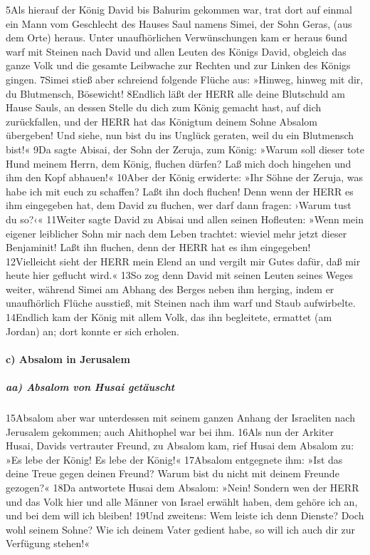 5Als hierauf der König David bis Bahurim gekommen war, trat dort auf
einmal ein Mann vom Geschlecht des Hauses Saul namens Simei, der Sohn
Geras, (aus dem Orte) heraus. Unter unaufhörlichen Verwünschungen kam er
heraus 6und warf mit Steinen nach David und allen Leuten des Königs
David, obgleich das ganze Volk und die gesamte Leibwache zur Rechten und
zur Linken des Königs gingen. 7Simei stieß aber schreiend folgende
Flüche aus: »Hinweg, hinweg mit dir, du Blutmensch, Bösewicht! 8Endlich
läßt der HERR alle deine Blutschuld am Hause Sauls, an dessen Stelle du
dich zum König gemacht hast, auf dich zurückfallen, und der HERR hat das
Königtum deinem Sohne Absalom übergeben! Und siehe, nun bist du ins
Unglück geraten, weil du ein Blutmensch bist!« 9Da sagte Abisai, der
Sohn der Zeruja, zum König: »Warum soll dieser tote Hund meinem Herrn,
dem König, fluchen dürfen? Laß mich doch hingehen und ihm den Kopf
abhauen!« 10Aber der König erwiderte: »Ihr Söhne der Zeruja, was habe
ich mit euch zu schaffen? Laßt ihn doch fluchen! Denn wenn der HERR es
ihm eingegeben hat, dem David zu fluchen, wer darf dann fragen: ›Warum
tust du so?‹« 11Weiter sagte David zu Abisai und allen seinen Hofleuten:
»Wenn mein eigener leiblicher Sohn mir nach dem Leben trachtet: wieviel
mehr jetzt dieser Benjaminit! Laßt ihn fluchen, denn der HERR hat es ihm
eingegeben! 12Vielleicht sieht der HERR mein Elend an und vergilt mir
Gutes dafür, daß mir heute hier geflucht wird.« 13So zog denn David mit
seinen Leuten seines Weges weiter, während Simei am Abhang des Berges
neben ihm herging, indem er unaufhörlich Flüche ausstieß, mit Steinen
nach ihm warf und Staub aufwirbelte. 14Endlich kam der König mit allem
Volk, das ihn begleitete, ermattet (am Jordan) an; dort konnte er sich
erholen.

\hypertarget{c-absalom-in-jerusalem}{%
\paragraph{c) Absalom in Jerusalem}\label{c-absalom-in-jerusalem}}

\hypertarget{aa-absalom-von-husai-getuxe4uscht}{%
\subparagraph{aa) Absalom von Husai
getäuscht}\label{aa-absalom-von-husai-getuxe4uscht}}

15Absalom aber war unterdessen mit seinem ganzen Anhang der Israeliten
nach Jerusalem gekommen; auch Ahithophel war bei ihm. 16Als nun der
Arkiter Husai, Davids vertrauter Freund, zu Absalom kam, rief Husai dem
Absalom zu: »Es lebe der König! Es lebe der König!« 17Absalom entgegnete
ihm: »Ist das deine Treue gegen deinen Freund? Warum bist du nicht mit
deinem Freunde gezogen?« 18Da antwortete Husai dem Absalom: »Nein!
Sondern wen der HERR und das Volk hier und alle Männer von Israel
erwählt haben, dem gehöre ich an, und bei dem will ich bleiben! 19Und
zweitens: Wem leiste ich denn Dienste? Doch wohl seinem Sohne? Wie ich
deinem Vater gedient habe, so will ich auch dir zur Verfügung stehen!«

